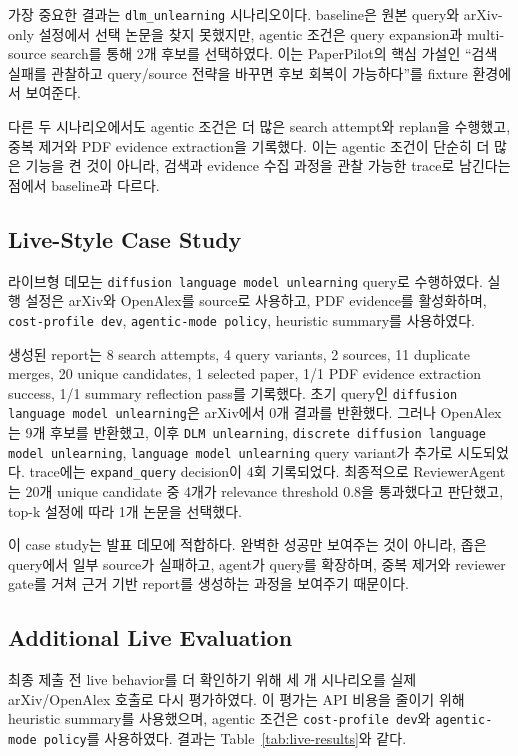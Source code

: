 \documentclass[sigconf,nonacm]{acmart}
\begin{document}
가장 중요한 결과는 \texttt{dlm\_unlearning} 시나리오이다. baseline은 원본 query와 arXiv-only 설정에서 선택 논문을 찾지 못했지만, agentic 조건은 query expansion과 multi-source search를 통해 2개 후보를 선택하였다. 이는 PaperPilot의 핵심 가설인 ``검색 실패를 관찰하고 query/source 전략을 바꾸면 후보 회복이 가능하다''를 fixture 환경에서 보여준다.

다른 두 시나리오에서도 agentic 조건은 더 많은 search attempt와 replan을 수행했고, 중복 제거와 PDF evidence extraction을 기록했다. 이는 agentic 조건이 단순히 더 많은 기능을 켠 것이 아니라, 검색과 evidence 수집 과정을 관찰 가능한 trace로 남긴다는 점에서 baseline과 다르다.

\subsection{Live-Style Case Study}

라이브형 데모는 \texttt{diffusion language model unlearning} query로 수행하였다. 실행 설정은 arXiv와 OpenAlex를 source로 사용하고, PDF evidence를 활성화하며, \texttt{cost-profile dev}, \texttt{agentic-mode policy}, heuristic summary를 사용하였다.

생성된 report는 8 search attempts, 4 query variants, 2 sources, 11 duplicate merges, 20 unique candidates, 1 selected paper, 1/1 PDF evidence extraction success, 1/1 summary reflection pass를 기록했다. 초기 query인 \texttt{diffusion language model unlearning}은 arXiv에서 0개 결과를 반환했다. 그러나 OpenAlex는 9개 후보를 반환했고, 이후 \texttt{DLM unlearning}, \texttt{discrete diffusion language model unlearning}, \texttt{language model unlearning} query variant가 추가로 시도되었다. trace에는 \texttt{expand\_query} decision이 4회 기록되었다. 최종적으로 ReviewerAgent는 20개 unique candidate 중 4개가 relevance threshold 0.8을 통과했다고 판단했고, top-k 설정에 따라 1개 논문을 선택했다.

이 case study는 발표 데모에 적합하다. 완벽한 성공만 보여주는 것이 아니라, 좁은 query에서 일부 source가 실패하고, agent가 query를 확장하며, 중복 제거와 reviewer gate를 거쳐 근거 기반 report를 생성하는 과정을 보여주기 때문이다.

\subsection{Additional Live Evaluation}

최종 제출 전 live behavior를 더 확인하기 위해 세 개 시나리오를 실제 arXiv/OpenAlex 호출로 다시 평가하였다. 이 평가는 API 비용을 줄이기 위해 heuristic summary를 사용했으며, agentic 조건은 \texttt{cost-profile dev}와 \texttt{agentic-mode policy}를 사용하였다. 결과는 Table~\ref{tab:live-results}와 같다.
\end{document}
